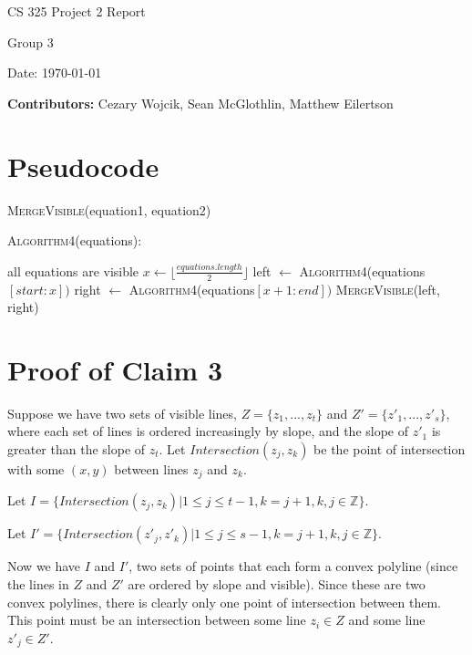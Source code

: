 \documentclass[12pt,letterpaper]{article}
\begin{document}
\begin{titlepage}
    \vspace*{4cm}
    {\huge \center
        CS 325 Project 2 Report\\[1cm]
    }
    \center
    {\large
        Group 3

        Date: \today

    \textbf{Contributors:}
    Cezary Wojcik,
    Sean McGlothlin,
    Matthew Eilertson
    }

\end{titlepage}


\section{Pseudocode}

\textsc{MergeVisible}(equation1, equation2)


\textsc{Algorithm4}(equations):

\begin{algorithmic}
	\State all equations are visible
\Else
	\State $x \gets \lfloor\frac{equations.length}{2}\rfloor$
	\State left $\gets$ \textsc{Algorithm4}(equations$[start:x])$
	\State right $\gets$ \textsc{Algorithm4}(equations$[x+1:end])$
	\State \textsc{MergeVisible}(left, right)
\EndIf
\end{algorithmic}

\section{Proof of Claim 3}

Suppose we have two sets of visible lines, $Z = \{ z_1, ..., z_t \}$ and $Z' = \{ z'_1, ..., z'_s \}$, where each set of lines is ordered increasingly by slope, and the slope of $z'_1$ is greater than the slope of $z_t$. Let $Intersection(z_j, z_k)$ be the point of intersection with some $(x, y)$ between lines $z_j$ and $z_k$. 

Let $I  = \{ Intersection(z_j, z_k) | 1 \leq j \leq t - 1, k = j + 1, k, j \in \mathbb{Z} \}$.

Let $I' = \{ Intersection(z'_j, z'_k) | 1 \leq j \leq s - 1, k = j + 1, k, j \in \mathbb{Z}  \}$.

Now we have $I$ and $I'$, two sets of points that each form a convex polyline (since the lines in $Z$ and $Z'$ are ordered by slope and visible). Since these are two convex polylines, there is clearly only one point of intersection between them. This point must be an intersection between some line $z_i \in Z$ and some line $z'_j \in Z'$.
\end{document}
